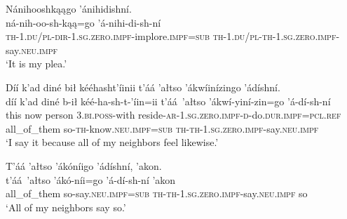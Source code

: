 \ea\label{ex:text7-17-19}
Nánihooshkąągo ’ánihidishní.\\
\gll ná-nih-oo-sh-kąą=go	’á-nihi-di-sh-ní\\
     \textsc{th}-1.\textsc{du}/\textsc{pl}-\textsc{dir}-1.\textsc{sg}.\textsc{zero}.\textsc{impf}-implore.\textsc{impf}=\textsc{sub}	\textsc{th}-1.\textsc{du}/\textsc{pl}-\textsc{th}-1.\textsc{sg}.\textsc{zero}.\textsc{impf}-say.\textsc{neu}.\textsc{impf}\\
\glt `It is my plea.'
\z

\ea\label{ex:text7-17-20}
Díí k’ad diné bił kééhasht’íinii t’áá ’ałtso ’ákwíinízingo ’ádíshní.\\
\gll díí	k’ad	diné	b-ił	kéé-ha-sh-t-’íin=ii	t’áá~{’ałtso}	’ákwí-yiní-zin=go	’á-dí-sh-ní\\
     this	now	person	3.\textsc{bi}.\textsc{poss}-with	reside-\textsc{ar}-1.\textsc{sg}.\textsc{zero}.\textsc{impf}-\textsc{d}-do.\textsc{dur}.\textsc{impf}=\textsc{pcl}.\textsc{ref}	all\_of\_them	so-\textsc{th}-know.\textsc{neu}.\textsc{impf}=\textsc{sub}	\textsc{th}-\textsc{th}-1.\textsc{sg}.\textsc{zero}.\textsc{impf}-say.\textsc{neu}.\textsc{impf}\\
\glt `I say it because all of my neighbors feel likewise.'
\z

\ea\label{ex:text7-17-21}
T’áá ’ałtso ’ákóníigo ’ádíshní, ’akon.\\
\gll t’áá~{’ałtso}	’ákó-níi=go	’á-dí-sh-ní	’akon\\
     all\_of\_them	so-say.\textsc{neu}.\textsc{impf}=\textsc{sub}	\textsc{th}-\textsc{th}-1.\textsc{sg}.\textsc{zero}.\textsc{impf}-say.\textsc{neu}.\textsc{impf}	so\\
\glt `All of my neighbors say so.'
\z
